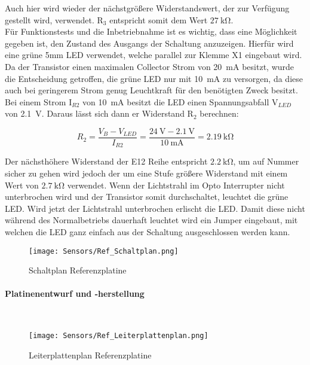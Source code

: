 Auch hier wird wieder der nächstgrößere Widerstandswert, der zur Verfügung gestellt wird, verwendet. R$_{3}$ entspricht somit dem Wert $\qty{27}{\kilo\ohm}$.\\
Für Funktionstests und die Inbetriebnahme ist es wichtig, dass eine Möglichkeit gegeben ist, den Zustand des Ausgangs der Schaltung anzuzeigen. Hierfür wird eine grüne 5mm LED verwendet, welche parallel zur Klemme X1 eingebaut wird. Da der Transistor einen maximalen Collector Strom von \qty{20}{\milli\ampere} besitzt, wurde die Entscheidung getroffen, die grüne LED nur mit \qty{10}{\milli\ampere} zu versorgen, da diese auch bei geringerem Strom genug Leuchtkraft für den benötigten Zweck besitzt. Bei einem Strom I$_{R2}$ von \qty{10}{\milli\ampere} besitzt die LED einen Spannungsabfall V$_{LED}$ von \qty{2.1}{\volt}.\cite{led_grün} Daraus lässt sich dann er Widerstand R$_{2}$ berechnen:

\begin{equation*}
    R_{2} = \frac{V_{B} - V_{LED}}{I_{R2}} = \frac{\qty{24}{\volt} - \qty{2.1}{\volt}}{\qty{10}{\milli\ampere}} = \qty{2.19}{\kilo\ohm}
\end{equation*}

Der nächsthöhere Widerstand der E12 Reihe entspricht $\qty{2,2}{\kilo\ohm}$, um auf Nummer sicher zu gehen wird jedoch der um eine Stufe größere Widerstand mit einem Wert von $\qty{2,7}{\kilo\ohm}$ verwendet. Wenn der Lichtstrahl im Opto Interrupter nicht unterbrochen wird und der Transistor somit durchschaltet, leuchtet die grüne LED. Wird jetzt der Lichtstrahl unterbrochen erlischt die LED. Damit diese nicht während des Normalbetriebs dauerhaft leuchtet wird ein Jumper eingebaut, mit welchen die LED ganz einfach aus der Schaltung ausgeschlossen werden kann.

\begin{figure}[H]
    \centering
    \texttt{[image: Sensors/Ref\_Schaltplan.png]}
    \caption{Schaltplan Referenzplatine}
    \label{Ref_Schaltplan}
\end{figure}

\paragraph{Platinenentwurf und -herstellung} \mbox{}\\


\begin{figure}[H]
    \centering
    \texttt{[image: Sensors/Ref\_Leiterplattenplan.png]}
    \caption{Leiterplattenplan Referenzplatine}
    \label{Ref_LPPlan}
\end{figure}

